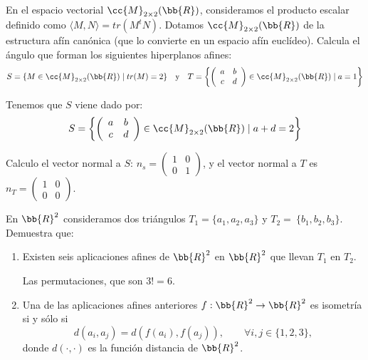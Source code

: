\begin{ejercicio}
    En el espacio vectorial $\cc{M}_{2\times 2}(\bb{R})$, consideramos el producto escalar definido como $\langle M, N\rangle = tr(M^tN)$. Dotamos $\cc{M}_{2\times 2}(\bb{R})$ de la estructura afín canónica (que lo convierte en un espacio afín euclídeo). Calcula el ángulo que forman los siguientes hiperplanos afines:
    \begin{equation*}
        S = \{M \in \cc{M}_{2\times 2}(\bb{R}) \mid tr(M) = 2\}
        \quad \text{y}\quad 
        T = \left\{\left(\begin{array}{cc}
            a & b \\ c & d
        \end{array}\right) \in \cc{M}_{2\times 2}(\bb{R}) \mid a = 1 \right\}
    \end{equation*}


    Tenemos que $S$ viene dado por:
    \begin{equation*}
        S = \left\{\left(\begin{array}{cc}
            a & b \\ c & d
        \end{array}\right) \in \cc{M}_{2\times 2}(\bb{R}) \mid a + d = 2 \right\}
    \end{equation*}

    Calculo el vector normal a $S$: $n_s=\left(\begin{array}{cc}
            1 & 0 \\ 0 & 1
        \end{array}\right)$, y el vector normal a $T$ es $n_T=\left(\begin{array}{cc}
            1 & 0 \\ 0 & 0
        \end{array}\right)$.
\end{ejercicio}


\begin{ejercicio}
    En $\bb{R}^2$ consideramos dos triángulos $T_1 = \{a_1, a_2, a_3\}$ y $T_2=~\{b_1, b_2, b_3\}$. Demuestra que:
    \begin{enumerate}
        \item Existen seis aplicaciones afines de $\bb{R}^2$ en $\bb{R}^2$ que llevan $T_1$ en $T_2$.

        Las permutaciones, que son $3!=6$.

        \item Una de las aplicaciones afines anteriores $f : \bb{R}^2 \to \bb{R}^2$ es isometría si y sólo si
        \begin{equation*}
            d(a_i, a_j ) = d(f(a_i), f(a_j )), \qquad \forall i, j \in \{1, 2, 3\},
        \end{equation*}
        donde $d(\cdot, \cdot)$ es la función distancia de $\bb{R}^2$.
    \end{enumerate}
\end{ejercicio}

